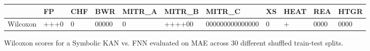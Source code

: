 \begin{tabular}{lllllllllll}
\toprule
 & FP & CHF & BWR & MITR_A & MITR_B & MITR_C & XS & HEAT & REA & HTGR \\
\midrule
Wilcoxon & +++0 & 0 & 00000 & 0 & ++++00 & 000000000000000 & 0 & + & 0000 & 0000 \\
\bottomrule
\end{tabular}
\caption{Wilcoxon scores for a Symbolic KAN vs. FNN evaluated on MAE across 30 different shuffled train-test splits.}